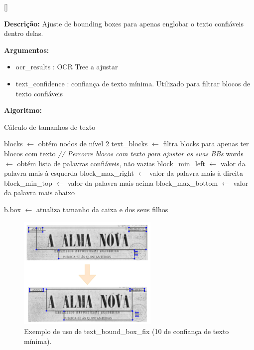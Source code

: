 [\normalsize]

\textbf{Descrição:} Ajuste de bounding boxes para apenas englobar o texto confiáveis dentro delas.

\textbf{Argumentos:}
\begin{itemize}\setlength\itemsep{-0.3em}
	\item ocr\_results : OCR Tree a ajustar
	\item text\_confidence : confiança de texto mínima. Utilizado para filtrar blocos de texto confiáveis
\end{itemize}

\textbf{Algoritmo:}

\begin{breakablealgorithm}
	\caption{Cálculo de tamanhos de texto}
	\begin{algorithmic}[1]
		
		\State blocks $\leftarrow$ obtém nodos de nível 2
		\State text\_blocks $\leftarrow$ filtra blocks para apenas ter blocos com texto
		\State \textit{// Percorre blocos com texto para ajustar as suas BBs}
			\State words $\leftarrow$ obtém lista de palavras confiáveis, não vazias
			\State block\_min\_left $\leftarrow$ valor da palavra mais à esquerda
			\State block\_max\_right $\leftarrow$ valor da palavra mais à direita
			\State block\_min\_top $\leftarrow$ valor da palavra mais acima
			\State block\_max\_bottom $\leftarrow$ valor da palavra mais abaixo
			
				\State b.box $\leftarrow$ atualiza tamanho da caixa e dos seus filhos
			\EndIf
		\EndFor

		
	\end{algorithmic}
\end{breakablealgorithm}


\begin{figure}[H]
	\centering
	\includegraphics[width=0.6\textwidth]{images/ilustracoes/text_bound_box_fix_blocks.png}
	\caption{Exemplo de uso de text\_bound\_box\_fix (10 de confiança de texto mínima).}
	\label{fig:text_bound_box_fix_blocks}
\end{figure}


